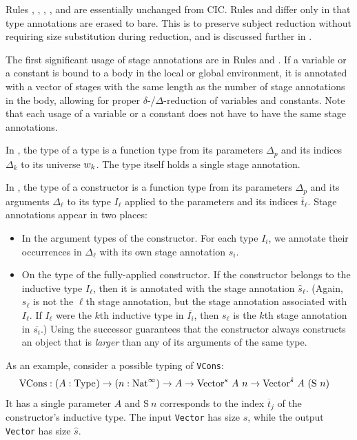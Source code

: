 \documentclass[acmsmall,screen,review,10pt]{acmart} %
\begin{document}
Rules , , ,  , and  are essentially unchanged from CIC. Rules  and  differ only in that type annotations are erased to bare. This is to preserve subject reduction without requiring size substitution during reduction, and is discussed further in \cite{cic-hat-bar}.

The first significant usage of stage annotations are in Rules  and . If a variable or a constant is bound to a body in the local or global environment, it is annotated with a vector of stages with the same length as the number of stage annotations in the body, allowing for proper $\delta$-/$\Delta$-reduction of variables and constants. Note that each usage of a variable or a constant does not have to have the same stage annotations.

In , the type of a \coinductive type is a function type from its parameters $\Delta_p$ and its indices $\Delta_k$ to its universe $w_k$. The \coinductive type itself holds a single stage annotation.

In , the type of a constructor is a function type from its parameters $\Delta_p$ and its arguments $\Delta_\ell$ to its \coinductive type $I_\ell$ applied to the parameters and its indices $\overline{t}_\ell$. Stage annotations appear in two places:
\begin{itemize}
    \item In the argument types of the constructor. For each \coinductive type $I_i$, we annotate their occurrences in $\Delta_\ell$ with its own stage annotation $s_i$.
    \item On the \coinductive type of the fully-applied constructor. If the constructor belongs to the inductive type $I_\ell$, then it is annotated with the stage annotation $\hat{s}_\ell$. (Again, $s_\ell$ is not the $\ell$th stage annotation, but the stage annotation associated with $I_\ell$. If $I_\ell$ were the $k$th inductive type in $\overline{I_i}$, then $s_\ell$ is the $k$th stage annotation in $\overline{s_i}$.) Using the successor guarantees that the constructor always constructs an object that is \textit{larger} than any of its arguments of the same type.
\end{itemize}
As an example, consider a possible typing of \texttt{VCons}:
\begin{align*}
\text{VCons} &: (A: \text{Type}_{}) \to (n:\text{Nat}^\infty) \to A \to \text{Vector}^s\ A\ n \to \text{Vector}^{\hat{s}}\ A\ (\text{S}\ n)
\end{align*}
It has a single parameter $A$ and $\text{S}\ n$ corresponds to the index $\overline{t}_j$ of the constructor's inductive type. The input \texttt{Vector} has size $s$, while the output \texttt{Vector} has size $\hat{s}$.
\end{document}
